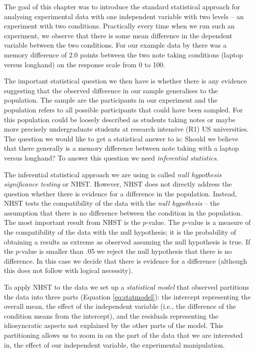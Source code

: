 \documentclass[
]{book}
\begin{document}
The goal of this chapter was to introduce the standard statistical approach for analysing experimental data with one independent variable with two levels -- an experiment with two conditions. Practically every time when we run such an experiment, we observe that there is some mean difference in the dependent variable between the two conditions. For our example data by \citet{urry2021} there was a memory difference of 2.0 points between the two note taking conditions (laptop versus longhand) on the response scale from 0 to 100.

The important statistical question we then have is whether there is any evidence suggesting that the observed difference in our sample generalises to the population. The sample are the participants in our experiment and the population refers to all possible participants that could have been sampled. For \citet{urry2021} this population could be loosely described as students taking notes or maybe more precisely undergraduate students at research intensive (R1) US universities. The question we would like to get a statistical answer to is: Should we believe that there generally is a memory difference between note taking with a laptop versus longhand? To answer this question we need \emph{inferential statistics}.

The inferential statistical approach we are using is called \emph{null hypothesis significance testing} or NHST. However, NHST does not directly address the question whether there is evidence for a difference in the population. Instead, NHST tests the compatibility of the data with the \emph{null hypothesis} -- the assumption that there is no difference between the condition in the population. The most important result from NHST is the \(p\)-value. The \(p\)-value is a measure of the compatibility of the data with the null hypothesis; it is the probability of obtaining a results as extreme as observed assuming the null hypothesis is true. If the \(p\)-value is smaller than .05 we reject the null hypothesis that there is no difference. In this case we decide that there is evidence for a difference (although this does not follow with logical necessity).

To apply NHST to the data we set up a \emph{statistical model} that observed partitions the data into three parts (Equation \eqref{eq:statmodel}): the intercept representing the overall mean, the effect of the independent variable (i.e., the difference of the condition means from the intercept), and the residuals representing the idiosyncratic aspects not explained by the other parts of the model. This partitioning allows us to zoom in on the part of the data that we are interested in, the effect of our independent variable, the experimental manipulation.
\end{document}
